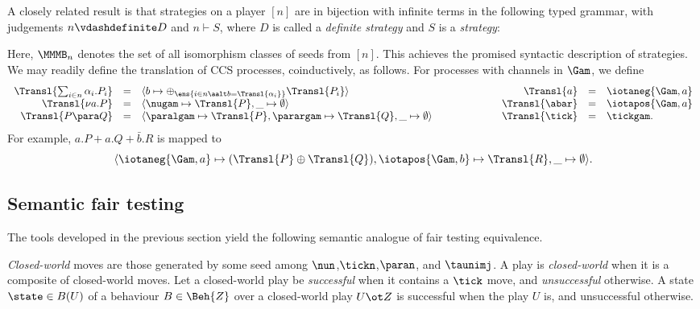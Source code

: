 \documentclass{LMCS}
\theoremstyle{plain}\newtheorem{satz}[thm]{Satz}
\begin{document}
A closely related result is that strategies on a player $[n]$ are in
bijection with infinite terms in the following typed grammar, with
judgements $n \vdashdefinite D$ and $n \vdash S$, where $D$ is called a
\emph{definite strategy} and $S$ is a \emph{strategy}:
Here, $\MMMB_n$ denotes the set of all isomorphism classes of seeds
from $[n]$.  This achieves the promised syntactic description of
strategies. We may readily define the translation of CCS processes,
coinductively, as follows. For processes with channels in $\Gam$, we
define
\begin{equation}
\begin{array}[t]{rcl}
  \Transl{\sum_{i \in n} \alpha_i.P_i} & = & \langle b \mapsto
      \oplus_{\ens{i \in n \aalt b = \Transl{\alpha_i}}} \Transl{P_i}
      \rangle \\
      \Transl{\nu a.P} & = & 
\langle
            \nugam  \mapsto  \Transl{P},
            \_  \mapsto  \emptyset 
            \rangle \\
      \Transl{P\para Q} & = & 
\langle
            \paralgam  \mapsto  \Transl{P}  ,
            \parargam  \mapsto  \Transl{Q}  ,
            \_  \mapsto  \emptyset 

 \rangle 
\end{array}
\hspace*{2cm} \begin{array}[t]{rcl}
    \Transl{a} & = & \iotaneg{\Gam,a} \\
    \Transl{\abar} & = & \iotapos{\Gam,a} \\
    \Transl{\tick} & = & \tickgam.
\end{array}
\label{eq:traduc}
\end{equation}
For example, $a.P + a.Q + \bar{b}.R$ is mapped to
$$\langle \iotaneg{\Gam,a} \mapsto (\Transl{P} \oplus \Transl{Q}),
\iotapos{\Gam,b} \mapsto \Transl{R}, \_ \mapsto \emptyset \rangle.$$


\subsection{Semantic fair testing}\label{subsec:fair}
The tools developed in the previous section yield the following
semantic analogue of fair testing equivalence.
\begin{defi}\label{def:cw:successful}
  \emph{Closed-world} moves are those generated by some seed among
  $\nun$,$\tickn$,$\paran$, and $\taunimj$. A play is
  \emph{closed-world} when it is a composite of closed-world moves.
  Let a closed-world play be \emph{successful} when it contains a
  $\tick$ move, and \emph{unsuccessful} otherwise. A state $\state \in
  B(U)$ of a behaviour $B \in \Beh{Z}$ over a closed-world play
  $U \ot Z$ is successful when the play $U$ is, and unsuccessful
  otherwise.
\end{defi}
\end{document}
